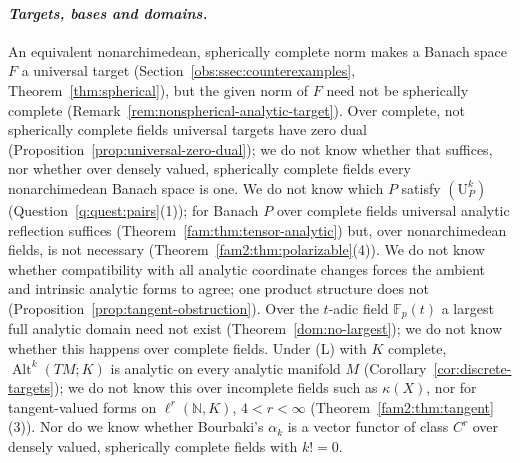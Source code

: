 \documentclass[11pt]{amsart}
\theoremstyle{definition}
\theoremstyle{remark}
\numberwithin{equation}{section}
\newcommand{\N}{\mathbb N}
\newcommand{\F}{\mathbb F}
\newcommand{\Alt}{\operatorname{Alt}}
\theoremstyle{plain}
\theoremstyle{definition}
\theoremstyle{plain}
\begin{document}
\paragraph{\textit{Targets, bases and domains.}}
An equivalent nonarchimedean, spherically complete norm makes a Banach space $F$ a universal target
(Section~\ref{obs:ssec:counterexamples}, Theorem~\ref{thm:spherical}), but the given norm of $F$ need not be spherically
complete (Remark~\ref{rem:nonspherical-analytic-target}). Over complete, not spherically complete fields universal targets have
zero dual (Proposition~\ref{prop:universal-zero-dual}); we do not know whether that suffices, nor whether over densely
valued, spherically complete fields every nonarchimedean Banach space is one. We do not know which $P$ satisfy
$(\mathrm U^k_P)$ (Question~\ref{q:quest:pairs}(1)); for Banach $P$ over complete fields universal analytic reflection
suffices (Theorem~\ref{fam:thm:tensor-analytic}) but, over nonarchimedean fields, is not necessary
(Theorem~\ref{fam2:thm:polarizable}(4)). We do not know whether compatibility with all analytic coordinate changes forces
the ambient and intrinsic analytic forms to agree; one product structure does not
(Proposition~\ref{prop:tangent-obstruction}). Over the $t$-adic field $\F_p(t)$ a largest full analytic domain need not
exist (Theorem~\ref{dom:no-largest}); we do not know whether this happens over complete fields. Under \textup{(L)} with
$K$ complete, $\Alt^k(TM;K)$ is analytic on every analytic manifold $M$ (Corollary~\ref{cor:discrete-targets}); we do
not know this over incomplete fields such as $\kappa(X)$, nor for tangent-valued forms on $\ell^r(\N,K)$, $4<r<\infty$
(Theorem~\ref{fam2:thm:tangent}(3)). Nor do we know whether Bourbaki's $\alpha_k$ is a vector functor of class $C^r$
over densely valued, spherically complete fields with $k!=0$.
\end{document}
